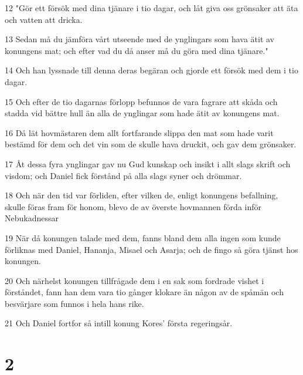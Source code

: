 \par 12 "Gör ett försök med dina tjänare i tio dagar, och låt giva oss grönsaker att äta och vatten att dricka.
\par 13 Sedan må du jämföra vårt utseende med de ynglingars som hava ätit av konungens mat; och efter vad du då anser må du göra med dina tjänare."
\par 14 Och han lyssnade till denna deras begäran och gjorde ett försök med dem i tio dagar.
\par 15 Och efter de tio dagarnas förlopp befunnos de vara fagrare att skåda och stadda vid bättre hull än alla de ynglingar som hade ätit av konungens mat.
\par 16 Då lät hovmästaren dem allt fortfarande slippa den mat som hade varit bestämd för dem och det vin som de skulle hava druckit, och gav dem grönsaker.
\par 17 Åt dessa fyra ynglingar gav nu Gud kunskap och insikt i allt slags skrift och visdom; och Daniel fick förstånd på alla slags syner och drömmar.
\par 18 Och när den tid var förliden, efter vilken de, enligt konungens befallning, skulle föras fram för honom, blevo de av överste hovmannen förda inför Nebukadnessar
\par 19 När då konungen talade med dem, fanns bland dem alla ingen som kunde förliknas med Daniel, Hananja, Misael och Asarja; och de fingo så göra tjänst hos konungen.
\par 20 Och närhelst konungen tillfrågade dem i en sak som fordrade vishet i förståndet, fann han dem vara tio gånger klokare än någon av de spåmän och besvärjare som funnos i hela hans rike.
\par 21 Och Daniel fortfor så intill konung Kores' första regeringsår.

\chapter{2}

